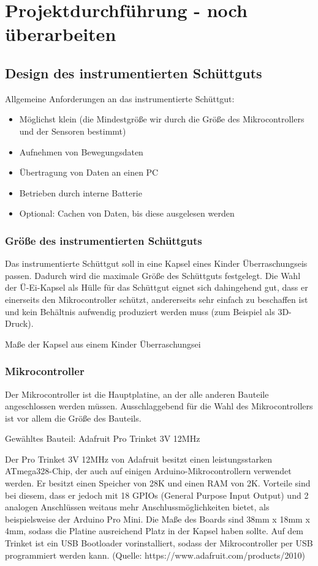 \section{Projektdurchführung - noch überarbeiten}

\subsection{Design des instrumentierten Schüttguts}
Allgemeine Anforderungen an das instrumentierte Schüttgut:

\begin{itemize}
	\item Möglichst klein (die Mindestgröße wir durch die Größe des Mikrocontrollers und der Sensoren bestimmt)
	\item Aufnehmen von Bewegungsdaten
	\item Übertragung von Daten an einen PC
	\item Betrieben durch interne Batterie
	\item Optional: Cachen von Daten, bis diese ausgelesen werden 
\end{itemize}

\subsubsection*{Größe des instrumentierten Schüttguts}

Das instrumentierte Schüttgut soll in eine Kapsel eines Kinder Überraschungseis passen. Dadurch wird die maximale Größe des Schüttguts festgelegt. Die Wahl der Ü-Ei-Kapsel als Hülle für das Schüttgut eignet sich dahingehend gut, dass er einerseits den Mikrocontroller schützt, andererseits sehr einfach zu beschaffen ist und kein Behältnis aufwendig produziert werden muss (zum Beispiel als 3D-Druck).

Maße der Kapsel aus einem Kinder Überraschungsei

\subsubsection{Mikrocontroller}

Der Mikrocontroller ist die Hauptplatine, an der alle anderen Bauteile angeschlossen werden müssen. Ausschlaggebend für die Wahl des Mikrocontrollers ist vor allem die Größe des Bauteils. 

Gewähltes Bauteil: Adafruit Pro Trinket 3V 12MHz

Der Pro Trinket 3V 12MHz von Adafruit besitzt einen leistungsstarken ATmega328-Chip, der auch auf einigen Arduino-Mikrocontrollern verwendet werden. Er besitzt einen Speicher von 28K und einen RAM von 2K. Vorteile sind bei diesem, dass er jedoch mit 18 GPIOs (General Purpose Input Output) und 2 analogen Anschlüssen weitaus mehr Anschlussmöglichkeiten bietet, als beispielsweise der Arduino Pro Mini. Die Maße des Boards sind  38mm x 18mm x 4mm, sodass die Platine ausreichend Platz in der Kapsel haben sollte. Auf dem Trinket ist ein USB Bootloader vorinstalliert, sodass der Mikrocontroller per USB programmiert werden kann. (Quelle: https://www.adafruit.com/products/2010)


%
